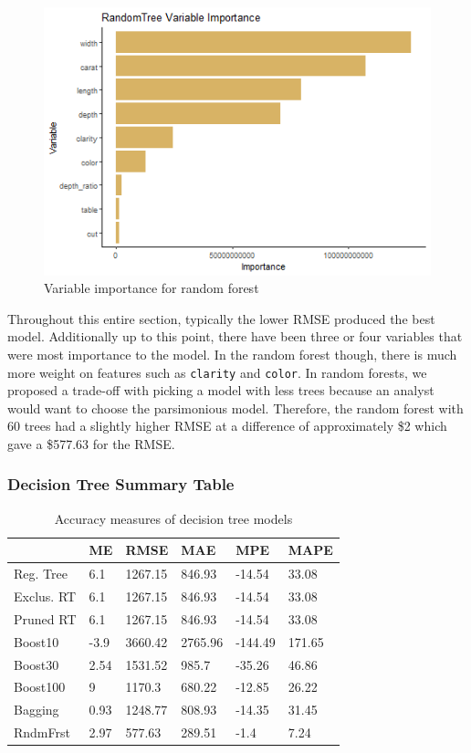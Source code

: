 \documentclass[
  paper=a4,
  ,captions=tableheading
]{scrartcl}
\begin{document}
\begin{figure}[H]

{\centering \includegraphics[width=0.5\linewidth,]{Diamonds_PDF_files/figure-latex/RF Variable Importance-1}

}

\caption{Variable importance for random forest}\label{fig:RF Variable Importance}
\end{figure}

Throughout this entire section, typically the lower RMSE produced the
best model. Additionally up to this point, there have been three or four
variables that were most importance to the model. In the random forest
though, there is much more weight on features such as \texttt{clarity}
and \texttt{color}. In random forests, we proposed a trade-off with
picking a model with less trees because an analyst would want to choose
the parsimonious model. Therefore, the random forest with 60 trees had a
slightly higher RMSE at a difference of approximately \$2 which gave a
\$577.63 for the RMSE.

\hypertarget{decision-tree-summary-table}{%
\subsubsection{Decision Tree Summary
Table}\label{decision-tree-summary-table}}

\begin{table}[!h]

\caption{\label{tab:RegTree Summary}Accuracy measures of decision tree models}
\centering
\begin{tabu} to 
\hline
  & ME & RMSE & MAE & MPE & MAPE\\
\hline
Reg. Tree & 6.1 & 1267.15 & 846.93 & -14.54 & 33.08\\
\hline
Exclus. RT & 6.1 & 1267.15 & 846.93 & -14.54 & 33.08\\
\hline
Pruned RT & 6.1 & 1267.15 & 846.93 & -14.54 & 33.08\\
\hline
Boost10 & -3.9 & 3660.42 & 2765.96 & -144.49 & 171.65\\
\hline
Boost30 & 2.54 & 1531.52 & 985.7 & -35.26 & 46.86\\
\hline
Boost100 & 9 & 1170.3 & 680.22 & -12.85 & 26.22\\
\hline
Bagging & 0.93 & 1248.77 & 808.93 & -14.35 & 31.45\\
\hline
RndmFrst & 2.97 & 577.63 & 289.51 & -1.4 & 7.24\\
\hline
\end{tabu}
\end{table}
\end{document}
